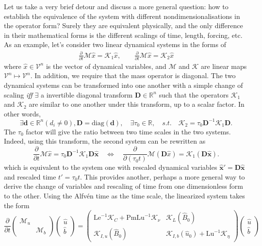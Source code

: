 \medskip
Let us take a very brief detour and discuss a more general question:
how to establish the equivalence of the system with different nondimensionalisations in the operator form? Surely they are equivalent physically, and the only difference in their mathematical forms is the different scalings of time, length, forcing, etc.
As an example, let's consider two linear dynamical systems in the forms of 
\[\begin{aligned}
    \frac{\partial}{\partial t}\mathcal{M} \hat{x} = \mathcal{K}_1 \hat{x},\qquad 
    \frac{\partial}{\partial t}\mathcal{M} \hat{x} = \mathcal{K}_2 \hat{x}
\end{aligned}\]
where $\hat{x} \in \mathcal{V}^n$ is the vector of dynamical variables, and $\mathcal{M}$ and $\mathcal{K}$ are linear maps $\mathcal{V}^n \mapsto \mathcal{V}^n$. In addition, we require that the mass operator is diagonal. 
The two dynamical systems can be transformed into one another with a simple change of scaling \textit{iff} $\exists$ a invertible diagonal transform $\mathbf{D} \in \mathbb{R}^n$ such that the operators $\mathcal{K}_1$ and $\mathcal{K}_2$ are similar to one another under this transform, up to a scalar factor. In other words,
\[
    \exists \mathbf{d} \in \mathbb{R}^n (d_i\neq 0), \mathbf{D} = \mathrm{diag}(\mathbf{d}),\quad \exists \tau_0 \in \mathbb{R}, \quad 
    s.t.\quad \mathcal{K}_2 = \tau_0 \mathbf{D}^{-1} \mathcal{K}_1 \mathbf{D}.
\]
The $\tau_0$ factor will give the ratio between two time scales in the two systems.
Indeed, using this transform, the second system can be rewritten as
\[
    \frac{\partial}{\partial t} \mathcal{M} \hat{x} = \tau_0 \mathbf{D}^{-1} \mathcal{K}_1 \mathbf{D} \hat{\mathbf{x}} \quad \Longleftrightarrow \quad 
    \frac{\partial}{\partial (\tau_0 t)} \mathcal{M} \left(\mathbf{D} \hat{x}\right) = \mathcal{K}_1 \left(\mathbf{D} \hat{\mathbf{x}}\right).
\]
which is equivalent to the system one with rescaled dynamical variables $\hat{\mathbf{x}}' = \mathbf{D} \hat{\mathbf{x}}$ and rescaled time $t' = \tau_0 t$.
This provides another, perhaps a more general way to derive the change of variables and rescaling of time from one dimensionless form to the other.
Using the Alfvén time as the time scale, the linearized system takes the form
\begin{equation}
    \frac{\partial}{\partial t} \begin{pmatrix} \mathcal{M}_u & \\ & \mathcal{M}_b \end{pmatrix}
    \begin{pmatrix} \hat{u} \\ \hat{b} \end{pmatrix} = 
    \begin{pmatrix}
        \mathrm{Le}^{-1} \mathcal{K}_C + \mathrm{Pm} \mathrm{Lu}^{-1} \mathcal{K}_\nu & \mathcal{K}_{L}(\hat{B}_0) \\ 
        \mathcal{K}_{I,u}(\hat{B}_0) & \mathcal{K}_{I,b}(\hat{u}_0) + \mathrm{Lu}^{-1} \mathcal{K}_\eta
    \end{pmatrix}
    \begin{pmatrix} \hat{u} \\ \hat{b} \end{pmatrix}
\end{equation}
